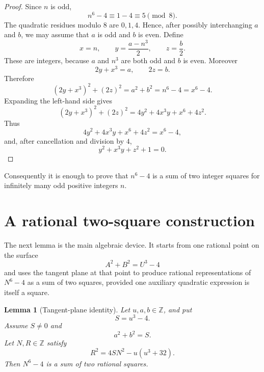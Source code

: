 \documentclass[11pt]{article}
\newtheorem{lemma}[theorem]{Lemma}
\theoremstyle{remark}
\begin{document}
\begin{proof}
Since \(n\) is odd,
\[
        n^6-4\equiv 1-4\equiv 5\pmod 8.
\]
The quadratic residues modulo \(8\) are \(0,1,4\).  Hence, after possibly
interchanging \(a\) and \(b\), we may assume that \(a\) is odd and \(b\) is
even.  Define
\[
        x=n,\qquad y=\frac{a-n^3}{2},\qquad z=\frac b2.
\]
These are integers, because \(a\) and \(n^3\) are both odd and \(b\) is even.
Moreover
\[
        2y+x^3=a,
        \qquad
        2z=b.
\]
Therefore
\[
        (2y+x^3)^2+(2z)^2=a^2+b^2=n^6-4=x^6-4.
\]
Expanding the left-hand side gives
\[
        (2y+x^3)^2+(2z)^2
        =4y^2+4x^3y+x^6+4z^2.
\]
Thus
\[
        4y^2+4x^3y+x^6+4z^2=x^6-4,
\]
and, after cancellation and division by \(4\),
\[
        y^2+x^3y+z^2+1=0.
\]
\end{proof}

Consequently it is enough to prove that \(n^6-4\) is a sum of two integer
squares for infinitely many odd positive integers \(n\).

\section{A rational two-square construction}

The next lemma is the main algebraic device.  It starts from one rational point
on the surface
\[
        A^2+B^2=U^3-4
\]
and uses the tangent plane at that point to produce rational representations of
\(N^6-4\) as a sum of two squares, provided one auxiliary quadratic expression is
itself a square.

\begin{lemma}[Tangent-plane identity]\label{lem:tangent}
Let \(u,a,b\in\mathbb Z\), and put
\[
        S=u^3-4.
\]
Assume \(S\neq0\) and
\[
        a^2+b^2=S.
\]
Let \(N,R\in\mathbb Z\) satisfy
\[
        R^2=4SN^2-u(u^3+32).       \tag{1}\label{eq:R-condition}
\]
Then \(N^6-4\) is a sum of two rational squares.
\end{lemma}
\end{document}
